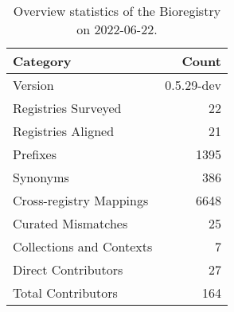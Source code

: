 \begin{table}
\centering
\caption{Overview statistics of the Bioregistry on 2022-06-22.}
\label{tab:bioregistry-summary}
\begin{tabular}{lr}
\toprule
                Category &      Count \\
\midrule
                 Version & 0.5.29-dev \\
     Registries Surveyed &         22 \\
      Registries Aligned &         21 \\
                Prefixes &       1395 \\
                Synonyms &        386 \\
 Cross-registry Mappings &       6648 \\
      Curated Mismatches &         25 \\
Collections and Contexts &          7 \\
     Direct Contributors &         27 \\
      Total Contributors &        164 \\
\bottomrule
\end{tabular}
\end{table}
